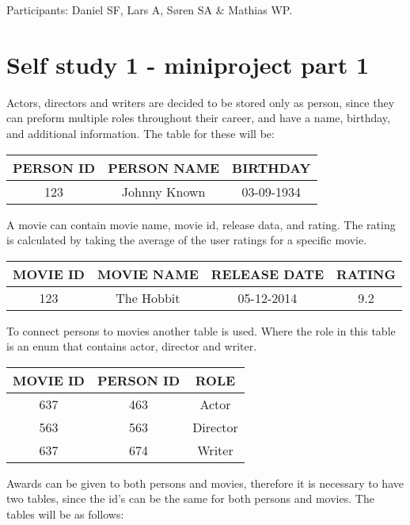 \documentclass[10pt,a4paper,final]{report}
\begin{document}
Participants:
Daniel SF,
Lars A,
S\o ren SA \&
Mathias WP.


\section*{Self study 1 - miniproject part 1}
Actors, directors and writers are decided to be stored only as person, since they can preform multiple roles throughout their career, and have a name, birthday, and additional information. The table for these will be:

\begin{table}[H] \centering
\begin{tabular}{|c|c|c|}
\hline 
PERSON ID & PERSON NAME & BIRTHDAY \\ 
\hline 
123 & Johnny Known & 03-09-1934 \\ 
\hline 
\end{tabular} 
\end{table}

A movie can contain movie name, movie id, release data, and rating. The rating is calculated by taking the average of the user ratings for a specific movie.

\begin{table}[H] \centering
\begin{tabular}{|c|c|c|c|}
\hline 
MOVIE ID & MOVIE NAME & RELEASE DATE & RATING\\ 
\hline 
123 & The Hobbit & 05-12-2014 & 9.2\\ 
\hline 
\end{tabular} 
\end{table}

To connect persons to movies another table is used. Where the role in this table is an enum that contains actor, director and writer.

\begin{table}[H] \centering
\begin{tabular}{|c|c|c|}
\hline 
MOVIE ID & PERSON ID & ROLE \\ 
\hline 
637 & 463 & Actor \\ 
\hline 
563 & 563 & Director \\ 
\hline 
637 & 674 & Writer \\ 
\hline 
\end{tabular}
\end{table}

Awards can be given to both persons and movies, therefore it is necessary to have two tables, since the id's can be the same for both persons and movies. The tables will be as follows:
\end{document}
